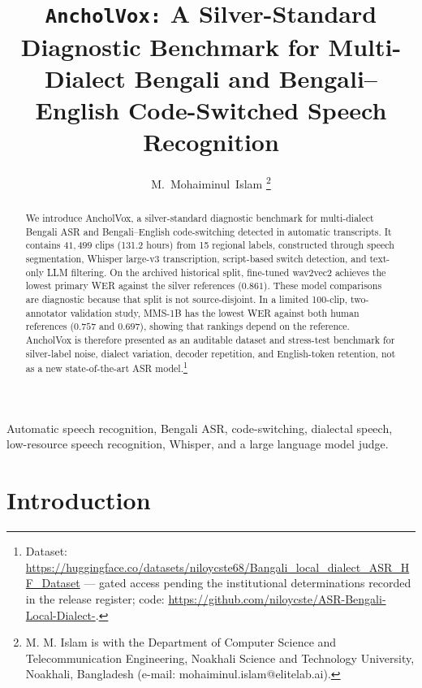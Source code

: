 \documentclass[journal]{IEEEtran}
\begin{document}
\title{\texttt{AncholVox:} A Silver-Standard Diagnostic Benchmark for
Multi-Dialect Bengali and Bengali--English Code-Switched Speech Recognition}

\author{M.~Mohaiminul~Islam%
\thanks{M. M. Islam is with the Department of Computer Science and
Telecommunication Engineering, Noakhali Science and Technology University,
Noakhali, Bangladesh (e-mail: mohaiminul.islam@elitelab.ai).}}

\maketitle

\begin{abstract}
We introduce AncholVox, a silver-standard diagnostic benchmark for
multi-dialect Bengali ASR and Bengali--English code-switching detected in
automatic transcripts. It contains $41{,}499$ clips (131.2 hours) from 15
regional labels, constructed through speech segmentation, Whisper large-v3
transcription, script-based switch detection, and text-only LLM filtering. On
the archived historical split, fine-tuned wav2vec2 achieves the lowest primary
WER against the silver references ($0.861$). These model comparisons are
diagnostic because that split is not source-disjoint. In a limited 100-clip,
two-annotator validation study, MMS-1B has the lowest WER against both human
references ($0.757$ and $0.697$), showing that rankings depend on the reference.
AncholVox is therefore presented as an auditable dataset and stress-test
benchmark for silver-label noise, dialect variation, decoder repetition, and
English-token retention, not as a new state-of-the-art ASR model.\footnote{Dataset: \url{https://huggingface.co/datasets/niloycste68/Bangali_local_dialect_ASR_HF_Dataset} --- gated access pending the institutional determinations recorded in the release register; code: \url{https://github.com/niloycste/ASR-Bengali-Local-Dialect-}.}
\end{abstract}

\begin{IEEEkeywords}
Automatic speech recognition, Bengali ASR, code-switching, dialectal speech,
low-resource speech recognition, Whisper, and a large language model judge.
\end{IEEEkeywords}

\IEEEpeerreviewmaketitle

\section{Introduction}
\end{document}
